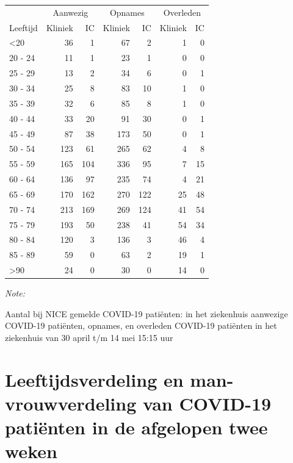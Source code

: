 \documentclass[
  english,
  man,floatsintext]{apa6}
\begin{document}
\begin{table}
\centering\begingroup\fontsize{10}{12}\selectfont

\begin{threeparttable}
\begin{tabular}{lrrrrrr}
\toprule
\multicolumn{1}{c}{ } & \multicolumn{2}{c}{Aanwezig} & \multicolumn{2}{c}{Opnames} & \multicolumn{2}{c}{Overleden} \\
\cmidrule(l{3pt}r{3pt}){2-3} \cmidrule(l{3pt}r{3pt}){4-5} \cmidrule(l{3pt}r{3pt}){6-7}
Leeftijd & Kliniek & IC & Kliniek & IC & Kliniek & IC\\
\midrule
<20 & 36 & 1 & 67 & 2 & 1 & 0\\
20 - 24 & 11 & 1 & 23 & 1 & 0 & 0\\
25 - 29 & 13 & 2 & 34 & 6 & 0 & 1\\
30 - 34 & 25 & 8 & 83 & 10 & 1 & 0\\
35 - 39 & 32 & 6 & 85 & 8 & 1 & 0\\
40 - 44 & 33 & 20 & 91 & 30 & 0 & 1\\
45 - 49 & 87 & 38 & 173 & 50 & 0 & 1\\
50 - 54 & 123 & 61 & 265 & 62 & 4 & 8\\
55 - 59 & 165 & 104 & 336 & 95 & 7 & 15\\
60 - 64 & 136 & 97 & 235 & 74 & 4 & 21\\
65 - 69 & 170 & 162 & 270 & 122 & 25 & 48\\
70 - 74 & 213 & 169 & 269 & 124 & 41 & 54\\
75 - 79 & 193 & 50 & 238 & 41 & 54 & 34\\
80 - 84 & 120 & 3 & 136 & 3 & 46 & 4\\
85 - 89 & 59 & 0 & 63 & 2 & 19 & 1\\
>90 & 24 & 0 & 30 & 0 & 14 & 0\\
\bottomrule
\end{tabular}
\begin{tablenotes}
\item \textit{Note: } 
\item Aantal bij NICE gemelde COVID-19 patiënten: in het ziekenhuis aanwezige COVID-19 patiënten, opnames, en overleden COVID-19 patiënten in het ziekenhuis van 30 april t/m 14 mei 15:15 uur
\end{tablenotes}
\end{threeparttable}
\endgroup{}
\end{table}

\newpage

\hypertarget{leeftijdsverdeling-en-man-vrouwverdeling-van-covid-19-patiuxebnten-in-de-afgelopen-twee-weken}{%
\section{Leeftijdsverdeling en man-vrouwverdeling van COVID-19 patiënten in de afgelopen twee weken}\label{leeftijdsverdeling-en-man-vrouwverdeling-van-covid-19-patiuxebnten-in-de-afgelopen-twee-weken}}
\end{document}
